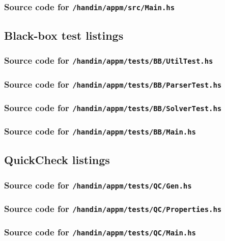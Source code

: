 \documentclass[12pt,a4paper]{article}
\begin{document}
\subsubsection{Source code for \texttt{/handin/appm/src/Main.hs}}


\subsection{Black-box test listings}
\subsubsection{Source code for \texttt{/handin/appm/tests/BB/UtilTest.hs}}

\subsubsection{Source code for \texttt{/handin/appm/tests/BB/ParserTest.hs}}

\subsubsection{Source code for \texttt{/handin/appm/tests/BB/SolverTest.hs}}

\subsubsection{Source code for \texttt{/handin/appm/tests/BB/Main.hs}}



\subsection{QuickCheck listings}
\subsubsection{Source code for \texttt{/handin/appm/tests/QC/Gen.hs}}

\subsubsection{Source code for \texttt{/handin/appm/tests/QC/Properties.hs}}

\subsubsection{Source code for \texttt{/handin/appm/tests/QC/Main.hs}}

\end{document}
